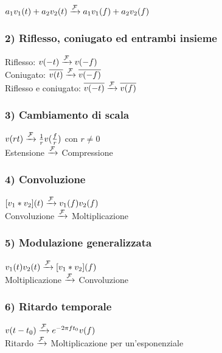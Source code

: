 	$ a_1 v_1 (t) + a_2 v_2 (t) \xrightarrow{ \mathcal{F}} a_1 v_1 (f) + a_2 v_2 (f) $
	
	\subsubsection{2) Riflesso, coniugato ed entrambi insieme }
	
	Riflesso: $ v(-t) \xrightarrow{ \mathcal{F}} v(-f) $\\
	Coniugato: $ \overline{v(t)} \xrightarrow{ \mathcal{F}} \overline{v(-f)} $\\
	Riflesso e coniugato: $ \overline{v(-t)} \xrightarrow{ \mathcal{F}} \overline{v(f)} $\\
	
	\subsubsection{3) Cambiamento di scala}
	
	$ v(rt) \xrightarrow{ \mathcal{F}} \frac{1}{r} v(\frac{f}{r}) $ con $ r \neq 0 $\\
	Estensione $ \xrightarrow{ \mathcal{F}}$ Compressione
	
	
	\subsubsection{4) Convoluzione}
	
	$ [ v_1 * v_2 ](t) \xrightarrow{ \mathcal{F}} v_1(f)v_2(f) $\\
	Convoluzione $ \xrightarrow{ \mathcal{F}}$ Moltiplicazione
	
	\subsubsection{5) Modulazione generalizzata}
	
	$ v_1(t)v_2(t) \xrightarrow{ \mathcal{F}} [ v_1 * v_2 ](f) $\\
	Moltiplicazione $ \xrightarrow{ \mathcal{F}}$ Convoluzione
	
	\subsubsection{6) Ritardo temporale}
	
	$ v(t-t_0) \xrightarrow{ \mathcal{F}} e^{-2 \pi f t_0} v(f) $\\
	Ritardo $ \xrightarrow{ \mathcal{F}}$ Moltiplicazione per un'esponenziale
	
